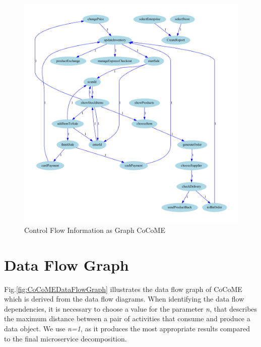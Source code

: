 \begin{figure}[h!]
	\centering
	\includegraphics[width=\textwidth, trim={2cm 0cm 2cm 0cm}]{img/CoCoMEControlFlowGraph.pdf}
	\caption{Control Flow Information as Graph CoCoME}
	\label{fig:CoCoMEControlFlowGraph}
\end{figure}


\section{Data Flow Graph}
\label{sec:SolutionApplication:DataFLowGraph}
Fig.\ref{fig:CoCoMEDataFlowGraph} illustrates the data flow graph of CoCoME which is derived from the data flow diagrams. When identifying the data flow dependencies, it is necessary to choose a value for the parameter \textit{n}, that describes the maximum distance between a pair of activities that consume and produce a data object. We use \textit{n=1}, as it produces the most appropriate results compared to the final microservice decomposition. 

